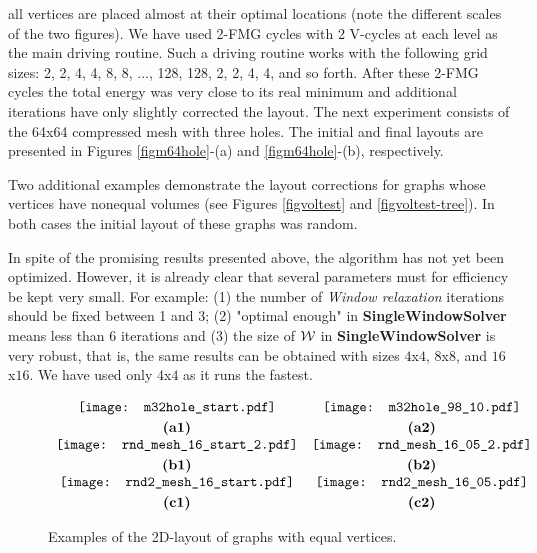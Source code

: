 \documentclass[final]{siamltex}
\begin{document}
  all vertices are placed almost at their optimal locations (note the different scales of the two figures).
 We have
  used 2-FMG cycles with 2 V-cycles at each level as the main driving routine.
  Such a driving routine works with the following
  grid sizes: 2, 2, 4, 4, 8, 8, ..., 128, 128, 2, 2, 4, 4, and so forth. After these 2-FMG cycles
  the total energy was very close to its real minimum and
  additional iterations have only slightly corrected the layout.  The next experiment consists of the 64x64 compressed
mesh with three holes. The initial and final layouts are
 presented in Figures \ref{figm64hole}-(a) and \ref{figm64hole}-(b), respectively.
\par Two additional examples demonstrate the layout corrections
for graphs whose vertices have nonequal volumes (see Figures \ref{figvoltest}
and \ref{figvoltest-tree}). In both cases the initial layout
of these graphs was random.
\par In spite of the promising results presented above,
the algorithm has not yet been optimized. However, it is already
clear that several parameters must for efficiency be kept very
small. For example: (1) the number of {\it Window relaxation}
iterations should be fixed between 1 and 3; (2) "optimal enough"
in {\bf SingleWindowSolver} means less than 6 iterations and (3)
the size of $\mathcal{W}$ in {\bf SingleWindowSolver} is very robust,
that is, the same results can be obtained with sizes $4$x$4$, $8$x$8$,
and $16$x$16$. We have used only $4$x$4$ as it runs the fastest.




\begin{figure}
\begin{center}
$\begin{array}{cc}
\texttt{[image: m32hole\_start.pdf]} &
\texttt{[image: m32hole\_98\_10.pdf]} \\ [0.1cm]
\mbox{\bf (a1)} & \mbox{\bf (a2)}\\
\texttt{[image: rnd\_mesh\_16\_start\_2.pdf]} &
\texttt{[image: rnd\_mesh\_16\_05\_2.pdf]} \\ [0.1cm]
\mbox{\bf (b1)} & \mbox{\bf (b2)}\\
\texttt{[image: rnd2\_mesh\_16\_start.pdf]} &
\texttt{[image: rnd2\_mesh\_16\_05.pdf]} \\ [0.1cm]
\mbox{\bf (c1)} & \mbox{\bf (c2)}
\end{array}$
\end{center}
\caption{Examples of the 2D-layout of graphs with equal vertices.}
\label{figtest}
\end{figure}
\end{document}
